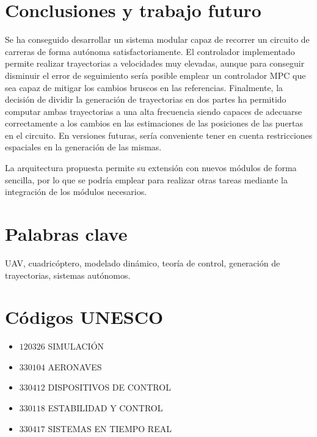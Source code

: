 \section*{Conclusiones y trabajo futuro}

Se ha conseguido desarrollar un sistema modular capaz de recorrer un circuito de carreras de forma autónoma satisfactoriamente. El controlador implementado permite realizar trayectorias a velocidades muy elevadas, aunque para conseguir disminuir el error de seguimiento sería posible emplear un controlador MPC que sea capaz de mitigar los cambios bruscos en las referencias. Finalmente, la decisión de dividir la generación de trayectorias en dos partes ha permitido computar ambas trayectorias a una alta frecuencia siendo capaces de adecuarse correctamente a los cambios en las estimaciones de las posiciones de las puertas en el circuito. En versiones futuras, sería conveniente tener en cuenta restricciones espaciales en la generación de las mismas.

La arquitectura propuesta permite su extensión con nuevos módulos de forma sencilla, por lo que se podría emplear para realizar otras tareas mediante la integración de los módulos necesarios.

\newpage
\section*{Palabras clave}
UAV, cuadricóptero, modelado dinámico, teoría de control, generación de trayectorias, sistemas autónomos.

\section*{Códigos UNESCO}
\begin{itemize}
	\item[] $120326$ \quad SIMULACIÓN
	\item[] $330104$ \quad AERONAVES
	\item[] $330412$ \quad DISPOSITIVOS DE CONTROL
	\item[]	$330118$ \quad ESTABILIDAD Y CONTROL
	\item[] $330417$ \quad SISTEMAS EN TIEMPO REAL 
		

\end{itemize}
\newpage
\cleardoublepage